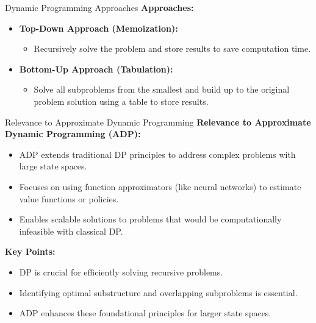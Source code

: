 \documentclass[aspectratio=169]{beamer}
\begin{document}
\begin{frame}[fragile]{Dynamic Programming Approaches}
    \textbf{Approaches:}
    \begin{itemize}
        \item \textbf{Top-Down Approach (Memoization):} 
        \begin{itemize}
            \item Recursively solve the problem and store results to save computation time.
        \end{itemize}
        \item \textbf{Bottom-Up Approach (Tabulation):}
        \begin{itemize}
            \item Solve all subproblems from the smallest and build up to the original problem solution using a table to store results.
        \end{itemize}
    \end{itemize}
\end{frame}

\begin{frame}[fragile]{Relevance to Approximate Dynamic Programming}
    \textbf{Relevance to Approximate Dynamic Programming (ADP):}
    \begin{itemize}
        \item ADP extends traditional DP principles to address complex problems with large state spaces.
        \item Focuses on using function approximators (like neural networks) to estimate value functions or policies.
        \item Enables scalable solutions to problems that would be computationally infeasible with classical DP.
    \end{itemize}
    
    \textbf{Key Points:}
    \begin{itemize}
        \item DP is crucial for efficiently solving recursive problems.
        \item Identifying optimal substructure and overlapping subproblems is essential.
        \item ADP enhances these foundational principles for larger state spaces.
    \end{itemize}
\end{frame}
\end{document}
